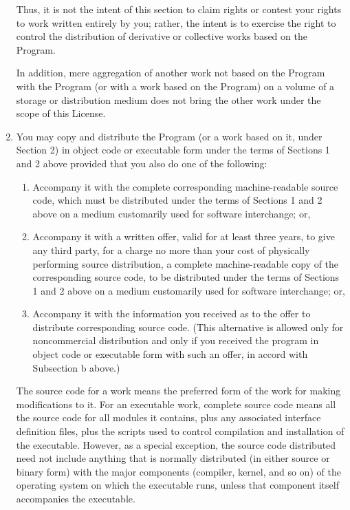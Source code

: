 \documentclass[oneside,english]{book}
\begin{document}
\begin{enumerate}
Thus, it is not the intent of this section to claim rights or contest
your rights to work written entirely by you; rather, the intent is
to exercise the right to control the distribution of derivative or
collective works based on the Program.

In addition, mere aggregation of another work not based on the Program
with the Program (or with a work based on the Program) on a volume
of a storage or distribution medium does not bring the other work
under the scope of this License.

\item You may copy and distribute the Program (or a work based on it, under
Section 2) in object code or executable form under the terms of Sections
1 and 2 above provided that you also do one of the following:

\begin{enumerate}
\item Accompany it with the complete corresponding machine-readable source
code, which must be distributed under the terms of Sections 1 and
2 above on a medium customarily used for software interchange; or,
\item Accompany it with a written offer, valid for at least three years,
to give any third party, for a charge no more than your cost of physically
performing source distribution, a complete machine-readable copy of
the corresponding source code, to be distributed under the terms of
Sections 1 and 2 above on a medium customarily used for software interchange;
or,
\item Accompany it with the information you received as to the offer to
distribute corresponding source code. (This alternative is allowed
only for noncommercial distribution and only if you received the program
in object code or executable form with such an offer, in accord with
Subsection b above.)
\end{enumerate}
The source code for a work means the preferred form of the work for
making modifications to it. For an executable work, complete source
code means all the source code for all modules it contains, plus any
associated interface definition files, plus the scripts used to control
compilation and installation of the executable. However, as a special
exception, the source code distributed need not include anything that
is normally distributed (in either source or binary form) with the
major components (compiler, kernel, and so on) of the operating system
on which the executable runs, unless that component itself accompanies
the executable.


\end{enumerate}
\end{document}
